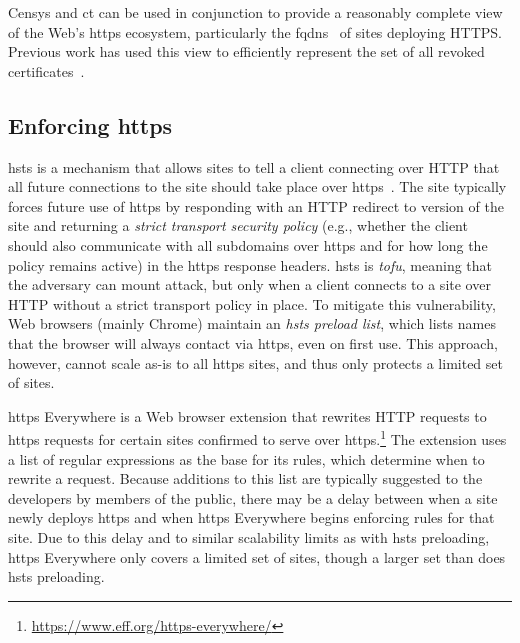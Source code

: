 Censys and \ac{ct} can be used in conjunction to provide a reasonably complete
view of the Web's \ac{https} ecosystem, particularly the \acp{fqdn}~\cite{vandersloot2016towards}
of sites deploying HTTPS.
Previous work has used this view to efficiently represent 
the set of all revoked certificates~\cite{larisch2017crlite}.

\subsection{Enforcing \ac{https}}

\ac{hsts} is a mechanism that allows sites to tell a client connecting over HTTP
that all future connections to the site should take place over
\ac{https}~\cite{rfc6797}. The site typically forces future use of \ac{https} by
responding with an HTTP redirect to  version of the site and
returning a \emph{strict transport security policy} (e.g., whether the client
should also communicate with all subdomains over \ac{https} and for how long the
policy remains active) in the \ac{https} response headers. \ac{hsts} is
\emph{\ac{tofu}}, meaning that the adversary can mount  attack, but
only when a client connects to a site over HTTP without a strict transport
policy in place. To mitigate this vulnerability, Web browsers (mainly Chrome)
maintain an \emph{\ac{hsts} preload list}, which lists names that the
browser will always contact via \ac{https}, even on first use. This approach,
however, cannot scale as-is to all \ac{https} sites, and thus only protects a
limited set of sites.

\ac{https} Everywhere is a Web browser extension that rewrites HTTP requests to
\ac{https} requests for certain sites confirmed to serve over
\ac{https}.\footnote{\url{https://www.eff.org/https-everywhere/}} The extension
uses a list of regular expressions as the base for its rules, which determine
when to rewrite a request. Because additions to this list are typically
suggested to the developers by members of the public, there may be a delay
between when a site newly deploys \ac{https} and when \ac{https} Everywhere
begins enforcing rules for that site. Due to this delay and to similar
scalability limits as with \ac{hsts} preloading, \ac{https} Everywhere only
covers a limited set of sites, though a larger set than does
\ac{hsts} preloading.

